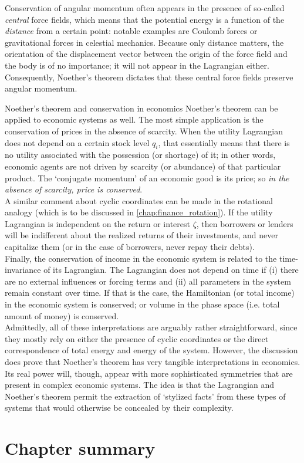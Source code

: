 Conservation of angular momentum often appears in the presence of so-called \emph{central} force fields, which means that the potential energy is a function of the \emph{distance} from a certain point: notable examples are Coulomb forces or gravitational forces in celestial mechanics. Because only distance matters, the orientation of the displacement vector between the origin of the force field and the body is of no importance; it will not appear in the Lagrangian either. Consequently, Noether's theorem dictates that these central force fields preserve angular momentum.

\begin{econ}{Noether's theorem and conservation in economics}
    Noether's theorem can be applied to economic systems as well. The most simple application is the conservation of prices in the absence of scarcity. When the utility Lagrangian does not depend on a certain stock level $q_i$, that essentially means that there is no utility associated with the possession (or shortage) of it; in other words, economic agents are not driven by scarcity (or abundance) of that particular product. The `conjugate momentum' of an economic good is its price; so \emph{in the absence of scarcity, price is conserved}.\\
    
    A similar comment about cyclic coordinates can be made in the rotational analogy (which is to be discussed in \cref{chap:finance_rotation}). If the utility Lagrangian is independent on the return or interest $\zeta$, then borrowers or lenders will be indifferent about the realized returns of their investments, and never capitalize them (or in the case of borrowers, never repay their debts).\\
    
    Finally, the conservation of income in the economic system is related to the time-invariance of its Lagrangian. The Lagrangian does not depend on time if (i) there are no external influences or forcing terms and (ii) all parameters in the system remain constant over time. If that is the case, the Hamiltonian (or total income) in the economic system is conserved; or volume in the phase space (i.e. total amount of money) is conserved.\\
    
    Admittedly, all of these interpretations are arguably rather straightforward, since they mostly rely on either the presence of cyclic coordinates or the direct correspondence of total energy and energy of the system. However, the discussion does prove that Noether's theorem has very tangible interpretations in economics. Its real power will, though, appear with more sophisticated symmetries that are present in complex economic systems. The idea is that the Lagrangian and Noether's theorem permit the extraction of `stylized facts' from these types of systems that would otherwise be concealed by their complexity. 
\end{econ}

\section*{Chapter summary} 